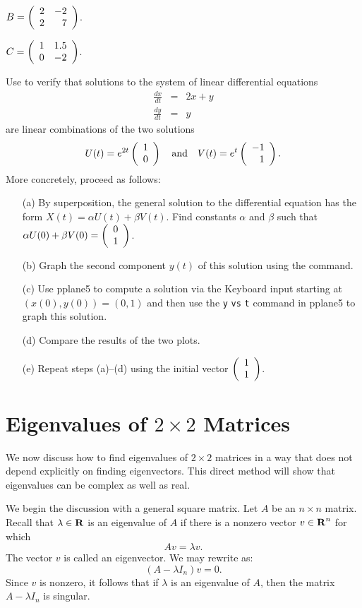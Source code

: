 \begin{exercise} \label{c4.5.5a}
$B=\left(\begin{array}{rr} 2 & -2\\ 2 &7\end{array}\right)$.
\end{exercise}
\begin{exercise} \label{c4.5.5b}
$C=\left(\begin{array}{rr} 1 & 1.5\\ 0 &-2\end{array}\right)$.
\end{exercise}

\begin{exercise} \label{c4.4.5}
Use \Matlab to verify that solutions to the system of linear differential
equations
\begin{eqnarray*}
\frac{dx}{dt} & = & 2x + y\\
\frac{dy}{dt} & = & y
\end{eqnarray*}
are linear combinations of the two solutions
\[
U(t) = e^{2t}\left(\begin{array}{r} 1 \\ 0\end{array}\right) \quad\mbox{and}\quad V(t) = e^{t}\left(\begin{array}{r} -1 \\ 1\end{array}\right).
\]
More concretely, proceed as follows:
\begin{itemize}
\item[(a)]  By superposition, the general solution to the differential
equation has the form $X(t)=\alpha U(t) + \beta V(t)$.  Find constants
$\alpha$ and $\beta$ such that $\alpha U(0) + \beta V(0) = \left(\begin{array}{r} 0 \\ 1\end{array}\right)$.
\item[(b)] Graph the second component $y(t)$ of this solution using the
 command.
\item[(c)] Use {\sf pplane5} to compute a solution via the {\sf Keyboard
input} starting at $(x(0),y(0)) = (0,1)$ and then use the
{\tt y} {\tt vs} {\tt t} command in {\sf pplane5} to graph this solution.
\item[(d)] Compare the results of the two plots.
\item[(e)]  Repeat steps (a)--(d) using the initial vector $\left(\begin{array}{r} 1 \\ 1\end{array}\right)$.
\end{itemize}
\end{exercise}


\section{Eigenvalues of $2\times 2$ Matrices}
\label{S:evchp}


We now discuss how to find eigenvalues
 of $2\times 2$ matrices in a way that does
not depend explicitly on finding eigenvectors.
 This direct method will show that
eigenvalues can be complex as well as real.

We begin the discussion with a general square matrix.  Let $A$
be an $n\times n$ matrix.  Recall that $\lambda\in\mbox{$\bf{R}$}$ is an
eigenvalue of $A$ if there is a nonzero vector $v\in\mbox{$\bf{R}$}^n$ for
which
\begin{equation}  \label{eigeneqn}
Av = \lambda v.
\end{equation}
The vector $v$ is called an eigenvector.  We may rewrite
 as:
\[
(A-\lambda I_n)v = 0.
\]
Since $v$ is nonzero, it follows that if $\lambda$ is an
eigenvalue of $A$, then the matrix $A-\lambda I_n$ is singular.

